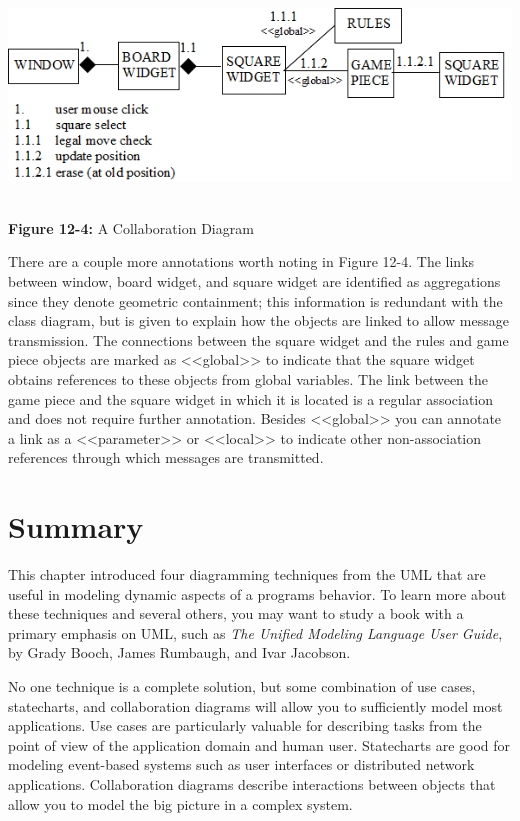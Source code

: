 \bigskip

\includegraphics[width=5.8in,height=2.2in]{ub-img/collabor.png}

{\sffamily\bfseries Figure 12-4:}
{\sffamily A Collaboration Diagram}

\bigskip

There are a couple more annotations worth noting in Figure 12-4. The
links between window, board widget, and square widget are identified as
aggregations since they denote geometric containment; this information
is redundant with the class diagram, but is given to explain how the
objects are linked to allow message transmission. The connections
between the square widget and the rules and game piece objects are
marked as {\textless}{\textless}global{\textgreater}{\textgreater} to
indicate that the square widget obtains references to these objects
from global variables. The link between the game piece and the square
widget in which it is located is a regular association and does not
require further annotation. Besides
{\textless}{\textless}global{\textgreater}{\textgreater} you can
annotate a link as a
{\textless}{\textless}parameter{\textgreater}{\textgreater} or
{\textless}{\textless}local{\textgreater}{\textgreater} to indicate
other non-association references through which messages are
transmitted.

\section*{Summary}

This chapter introduced four diagramming techniques from the UML that
are useful in modeling dynamic aspects of a program{\textquotesingle}s
behavior. To learn more about these techniques and several others, you
may want to study a book with a primary emphasis on UML, such as
\textit{The Unified Modeling Language User Guide}, by Grady Booch,
James Rumbaugh, and Ivar Jacobson.

No one technique is a complete solution, but some combination of use
cases, statecharts, and collaboration diagrams will allow you to
sufficiently model most applications. Use cases are particularly
valuable for describing tasks from the point of view of the application
domain and human user. Statecharts are good for modeling event-based
systems such as user interfaces or distributed network applications.
Collaboration diagrams describe interactions between objects that allow
you to model the big picture in a complex system.

